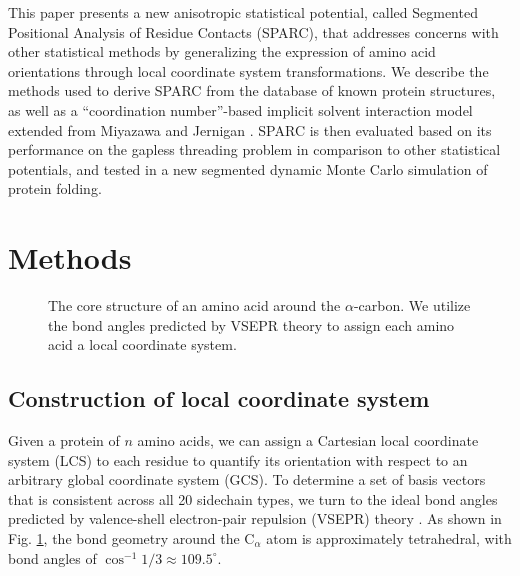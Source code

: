 \documentclass[11pt,twocolumn]{article}
\begin{document}
This paper presents a new anisotropic statistical potential, called Segmented Positional Analysis of Residue Contacts (SPARC), that addresses concerns with other statistical methods by generalizing the expression of amino acid orientations through local coordinate system transformations.
We describe the methods used to derive SPARC from the database of known protein structures, as well as a ``coordination number''-based implicit solvent interaction model extended from Miyazawa and Jernigan \cite{miyazawa}.
SPARC is then evaluated based on its performance on the gapless threading problem in comparison to other statistical potentials, and tested in a new segmented dynamic Monte Carlo simulation of protein folding.

\section{Methods}

\begin{figure}
	\begin{center}
	\end{center}
	\caption{The core structure of an amino acid around the $\alpha$-carbon. We utilize the bond angles predicted by VSEPR theory to assign each amino acid a local coordinate system.}
	\label{aminoacid_axes}
\end{figure}

\subsection{Construction of local coordinate system}
Given a protein of $n$ amino acids, we can assign a Cartesian local coordinate system (LCS) to each residue to quantify its orientation with respect to an arbitrary global coordinate system (GCS).
To determine a set of basis vectors that is consistent across all 20 sidechain types, we turn to the ideal bond angles predicted by valence-shell electron-pair repulsion (VSEPR) theory \cite{gillespie}.
As shown in Fig. \ref{aminoacid_axes}, the bond geometry around the C$_\alpha$ atom is approximately tetrahedral, with bond angles of $\cos^{-1}{1/3}\approx 109.5^\circ$.
\end{document}
